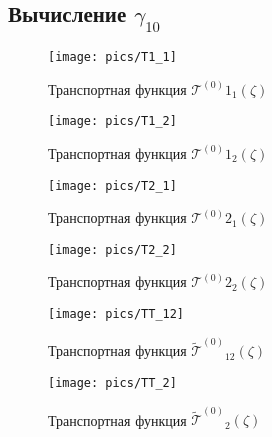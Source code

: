 \documentclass[a4paper,12pt]{article}
\newcommand{\T}[1][0]{\ensuremath{\mathcal{T}^{(#1)}}}
\newcommand{\TT}{\ensuremath{\tilde{\mathcal{T}}^{(0)}}}
\begin{document}
\subsection{Вычисление \texorpdfstring{$\gamma_{10}$}{gamma10}}

\begin{figure}
    \centering
    \begin{minipage}[b]{0.5\textwidth}
        \centering
        \texttt{[image: pics/T1\_1]}
        \caption{Транспортная функция \(\T{1}_1(\zeta)\)}
        \label{fig:T1_1}
    \end{minipage}%
    \begin{minipage}[b]{0.5\textwidth}
        \centering
        \texttt{[image: pics/T1\_2]}
        \caption{Транспортная функция \(\T{1}_2(\zeta)\)}
        \label{fig:T1_2}
    \end{minipage}
\end{figure}

\begin{figure}
    \centering
    \begin{minipage}[b]{0.5\textwidth}
        \centering
        \texttt{[image: pics/T2\_1]}
        \caption{Транспортная функция \(\T{2}_1(\zeta)\)}
        \label{fig:T2_1}
    \end{minipage}%
    \begin{minipage}[b]{0.5\textwidth}
        \centering
        \texttt{[image: pics/T2\_2]}
        \caption{Транспортная функция \(\T{2}_2(\zeta)\)}
        \label{fig:T2_2}
    \end{minipage}
\end{figure}

\begin{figure}
    \centering
    \begin{minipage}[b]{0.5\textwidth}
        \centering
        \texttt{[image: pics/TT\_12]}
        \caption{Транспортная функция \(\TT_{12}(\zeta)\)}
        \label{fig:TT12}
    \end{minipage}%
    \begin{minipage}[b]{0.5\textwidth}
        \centering
        \texttt{[image: pics/TT\_2]}
        \caption{Транспортная функция \(\TT_2(\zeta)\)}
        \label{fig:TT2}
    \end{minipage}
\end{figure}
\end{document}
